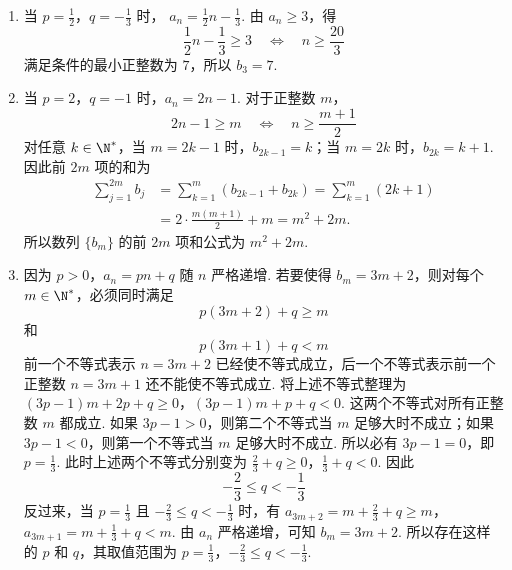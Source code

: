 \begin{solution}
\begin{enumerate}
\item 当 \(p=\frac{1}{2}\)，\(q=-\frac{1}{3}\) 时，
\(a_n=\frac{1}{2}n-\frac{1}{3}\).
由 \(a_n\geqslant3\)，得
\[
\frac{1}{2}n-\frac{1}{3}\geqslant3
\quad\Longleftrightarrow\quad
n\geqslant\frac{20}{3}
\]
满足条件的最小正整数为 \(7\)，所以 \(b_3=7\).

\item 当 \(p=2\)，\(q=-1\) 时，\(a_n=2n-1\).
对于正整数 \(m\)，
\[
2n-1\geqslant m
\quad\Longleftrightarrow\quad
n\geqslant\frac{m+1}{2}
\]
对任意 \(k\in\N^*\)，当 \(m=2k-1\) 时，\(b_{2k-1}=k\)；当 \(m=2k\) 时，\(b_{2k}=k+1\).
因此前 \(2m\) 项的和为
\[
\begin{aligned}
\sum_{j=1}^{2m}b_j
&=\sum_{k=1}^{m}\left(b_{2k-1}+b_{2k}\right)
=\sum_{k=1}^{m}(2k+1)\\
&=2\cdot\frac{m(m+1)}{2}+m=m^2+2m.
\end{aligned}
\]
所以数列 \(\{b_m\}\) 的前 \(2m\) 项和公式为 \(m^2+2m\).

\item 因为 \(p>0\)，\(a_n=pn+q\) 随 \(n\) 严格递增.
若要使得 \(b_m=3m+2\)，则对每个 \(m\in\N^*\)，必须同时满足
\[
p(3m+2)+q\geqslant m
\]
和
\[
p(3m+1)+q<m
\]
前一个不等式表示 \(n=3m+2\) 已经使不等式成立，后一个不等式表示前一个正整数 \(n=3m+1\) 还不能使不等式成立.
将上述不等式整理为
\((3p-1)m+2p+q\geqslant0\)，\((3p-1)m+p+q<0\).
这两个不等式对所有正整数 \(m\) 都成立.
如果 \(3p-1>0\)，则第二个不等式当 \(m\) 足够大时不成立；如果 \(3p-1<0\)，则第一个不等式当 \(m\) 足够大时不成立.
所以必有 \(3p-1=0\)，即 \(p=\frac{1}{3}\).
此时上述两个不等式分别变为
\(\frac{2}{3}+q\geqslant0\)，\(\frac{1}{3}+q<0\).
因此
\[
-\frac{2}{3}\leqslant q< -\frac{1}{3}
\]
反过来，当 \(p=\frac{1}{3}\) 且 \(-\frac{2}{3}\leqslant q< -\frac{1}{3}\) 时，有
\(a_{3m+2}=m+\frac{2}{3}+q\geqslant m\)，\(a_{3m+1}=m+\frac{1}{3}+q<m\).
由 \(a_n\) 严格递增，可知 \(b_m=3m+2\).
所以存在这样的 \(p\) 和 \(q\)，其取值范围为
\(p=\frac{1}{3}\)，\(-\frac{2}{3}\leqslant q< -\frac{1}{3}\).
\end{enumerate}
\end{solution}
